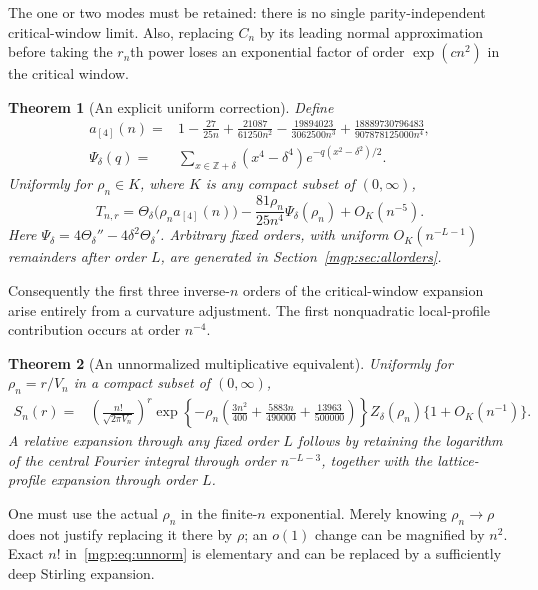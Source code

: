 \documentclass[11pt]{article}
\newtheorem{theorem}{Theorem}\newtheorem{lemma}[theorem]{Lemma}\newtheorem{corollary}[theorem]{Corollary}\newtheorem{remark}[theorem]{Remark}
\newcommand{\V}{V_n}\newcommand{\T}{T_{n,r}}\newcommand{\Z}{\mathbb Z}\newcommand{\E}{\mathbb E}\newcommand{\dd}{\,d}
\begin{document}
The one or two modes must be retained: there is no single parity-independent critical-window limit. Also, replacing $C_n$ by its leading normal approximation before taking the $r_n$th power loses an exponential factor of order $\exp(cn^2)$ in the critical window.

\begin{theorem}[An explicit uniform correction]\label{mgp:thm:fourth}
Define
\begin{align*}
 a_{[4]}(n)={}&1-\frac{27}{25n}+\frac{21087}{61250n^2}
 -\frac{19894023}{3062500n^3}
 +\frac{18889730796483}{907878125000n^4},\\
 \Psi_\delta(q)={}&\sum_{x\in\Z+\delta}(x^4-\delta^4)
             e^{-q(x^2-\delta^2)/2}.
\end{align*}
Uniformly for $\rho_n\in K$, where $K$ is any compact subset of $(0,\infty)$,
\[
 T_{n,r}=\Theta_\delta\bigl(\rho_n a_{[4]}(n)\bigr)
 -\frac{81\rho_n}{25n^4}\Psi_\delta(\rho_n)+O_K(n^{-5}).
\]
Here $\Psi_\delta=4\Theta_\delta''-4\delta^2\Theta_\delta'$. Arbitrary fixed orders, with uniform $O_K(n^{-L-1})$ remainders after order $L$, are generated in Section~\ref{mgp:sec:allorders}.
\end{theorem}
Consequently the first three inverse-$n$ orders of the critical-window expansion arise entirely from a curvature adjustment. The first nonquadratic local-profile contribution occurs at order $n^{-4}$.

\begin{theorem}[An unnormalized multiplicative equivalent]\label{mgp:thm:unnorm}
Uniformly for $\rho_n=r/\V$ in a compact subset of $(0,\infty)$,
\begin{align}
 S_n(r)={}&\left(\frac{n!}{\sqrt{2\pi\V}}\right)^r
 \exp\left\{-\rho_n\left(\frac{3n^2}{400}
                  +\frac{5883n}{490000}
                  +\frac{13963}{500000}\right)\right\}
 Z_\delta(\rho_n)\{1+O_K(n^{-1})\}.\label{mgp:eq:unnorm}
\end{align}
A relative expansion through any fixed order $L$ follows by retaining the logarithm of the central Fourier integral through order $n^{-L-3}$, together with the lattice-profile expansion through order $L$.
\end{theorem}
One must use the actual $\rho_n$ in the finite-$n$ exponential. Merely knowing $\rho_n\to\rho$ does not justify replacing it there by $\rho$; an $o(1)$ change can be magnified by $n^2$. Exact $n!$ in~\eqref{mgp:eq:unnorm} is elementary and can be replaced by a sufficiently deep Stirling expansion.
\end{document}
